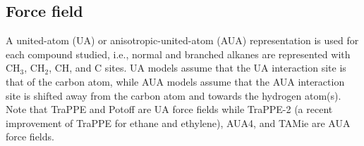 \documentclass[preprint,review,12pt]{elsarticle}
\begin{document}
	\subsection{Force field} \label{Force Field}
	
	A united-atom (UA) or anisotropic-united-atom (AUA) representation is used for each compound studied, i.e., normal and branched alkanes are represented with CH$_3$, CH$_2$, CH, and C sites. UA models assume that the UA interaction site is that of the carbon atom, while AUA models assume that the AUA interaction site is shifted away from the carbon atom and towards the hydrogen atom(s). Note that TraPPE and Potoff are UA force fields while TraPPE-2 (a recent improvement of TraPPE for ethane and ethylene), AUA4, and TAMie are AUA force fields. 
	
	
\end{document}
